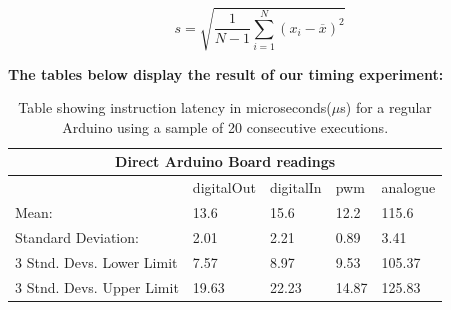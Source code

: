 $$
s = \sqrt{\frac{1}{N-1} \sum_{i=1}^N (x_i - \overline{x})^2}
$$
\label{eq:sd}

\newpage
\textbf{The tables below display the result of our timing experiment: }

\begin{table}[h!]
	\caption{Table showing instruction latency in microseconds($\mu$s) for a regular Arduino using a sample of 20 consecutive executions.}\label{table:arduinoboard}
	\begin{tabular}{|l|l|l|l|l|}
	\toprule
 \multicolumn{5}{c}{\textbf{Direct Arduino Board readings}} \\\hline

& digitalOut & digitalIn & pwm & analogue \\\hline
Mean:                   & 13.6 & 15.6 & 12.2 & 115.6\\\hline
Standard Deviation:     & 2.01 & 2.21  & 0.89  & 3.41 \\\hline
3 Stnd. Devs. Lower Limit& 7.57 & 8.97  & 9.53  & 105.37 \\\hline
3 Stnd. Devs. Upper Limit& 19.63& 22.23 & 14.87 & 125.83 \\\hline
\end{tabular}
\end{table}

